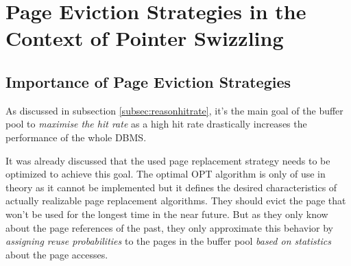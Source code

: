 \chapter[Page Eviction Strategies]{Page Eviction Strategies in the Context of Pointer Swizzling} \label{ch:eviction}

\section{Importance of Page Eviction Strategies} \label{sec:evictionreasons}
	
	As discussed in subsection \ref{subsec:reasonhitrate}, it's the main goal of the buffer pool to \emph{maximise the hit rate} as a high hit rate drastically increases the performance of the whole DBMS. 
	
	It was already discussed that the used page replacement strategy needs to be optimized to achieve this goal. The optimal OPT algorithm is only of use in theory as it cannot be implemented but it defines the desired characteristics of actually realizable page replacement algorithms. They should evict the page that won't be used for the longest time in the near future. But as they only know about the page references of the past, they only approximate this behavior by \emph{assigning reuse probabilities} to the pages in the buffer pool \emph{based on statistics} about the page accesses.
	
